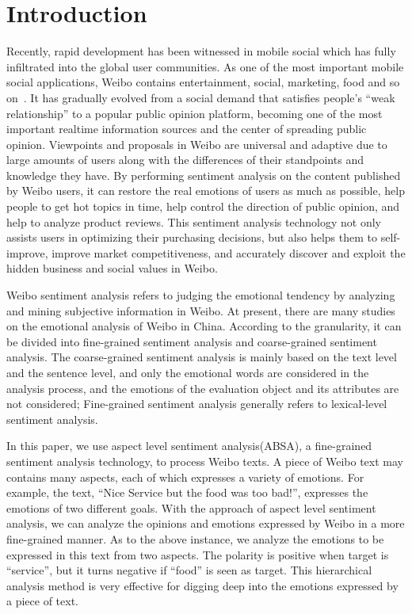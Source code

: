 \documentclass[runningheads, twocolumn]{llncs}
\begin{document}
\section{Introduction}
Recently, rapid development has been witnessed in mobile social which has fully infiltrated into the global user communities. As one of the most important mobile social applications, Weibo contains entertainment, social, marketing, food and so on~\cite{DBLP:conf/IEEEcit/ChenLZW16}. It has gradually evolved from a social demand that satisfies people’s “weak relationship” to a popular public opinion platform, becoming one of the most important realtime information sources and the center of spreading public opinion. Viewpoints and proposals in Weibo are universal and adaptive due to large amounts of users along with the differences of their standpoints and knowledge they have. By performing sentiment analysis on the content published by Weibo users, it can restore the real emotions of users as much as possible, help people to get hot topics in time, help control the direction of public opinion, and help to analyze product reviews. This sentiment analysis technology not only assists users in optimizing their purchasing decisions, but also helps them to self-improve, improve market competitiveness, and accurately discover and exploit the hidden business and social values in Weibo.

Weibo sentiment analysis refers to judging the emotional tendency by analyzing and mining subjective information in Weibo. At present, there are many studies on the emotional analysis of Weibo in China. According to the granularity, it can be divided into fine-grained sentiment analysis and coarse-grained sentiment analysis. The coarse-grained sentiment analysis is mainly based on the text level and the sentence level, and only the emotional words are considered in the analysis process, and the emotions of the evaluation object and its attributes are not considered; Fine-grained sentiment analysis generally refers to lexical-level sentiment analysis.

In this paper, we use aspect level sentiment analysis(ABSA), a fine-grained sentiment analysis technology, to process Weibo texts. A piece of Weibo text may contains many aspects, each of which expresses a variety of emotions. For example, the text, “Nice Service but the food was too bad!”, expresses the emotions of two different goals. With the approach of aspect level sentiment analysis, we can analyze the opinions and emotions expressed by Weibo in a more fine-grained manner. As to the above instance, we analyze the emotions to be expressed in this text from two aspects. The polarity is positive when target is “service”, but it turns negative if “food” is seen as target. This hierarchical analysis method is very effective for digging deep into the emotions expressed by a piece of text.
\end{document}
